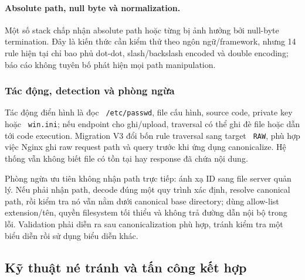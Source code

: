 \documentclass[runningheads]{report-template/llncs}
\newcommand{\code}[1]{\texttt{\small\hyphenchar\font=45 #1}}
\begin{document}
\paragraph{Absolute path, null byte và normalization.}
Một số stack chấp nhận absolute path hoặc từng bị ảnh hưởng bởi null-byte
termination. Đây là kiến thức cần kiểm thử theo ngôn ngữ/framework, nhưng
14 rule hiện tại chỉ bao phủ dot-dot, slash/backslash encoded và double
encoding; báo cáo không tuyên bố phát hiện mọi path manipulation.

\subsubsection{Tác động, detection và phòng ngừa}

Tác động điển hình là đọc \code{/etc/passwd}, file cấu hình, source code,
private key hoặc \code{win.ini}; nếu endpoint cho ghi/upload, traversal
có thể ghi đè file hoặc dẫn tới code execution. Migration V3 đổi bốn rule
traversal sang target \code{RAW}, phù hợp việc Nginx ghi raw request path
và query trước khi ứng dụng canonicalize. Hệ thống vẫn không biết file
có tồn tại hay response đã chứa nội dung.

Phòng ngừa ưu tiên không nhận path trực tiếp: ánh xạ ID sang file server
quản lý. Nếu phải nhận path, decode đúng một quy trình xác định, resolve
canonical path, rồi kiểm tra nó vẫn nằm dưới canonical base directory;
dùng allow-list extension/tên, quyền filesystem tối thiểu và không trả
đường dẫn nội bộ trong lỗi. Validation phải diễn ra sau canonicalization
phù hợp, tránh kiểm tra một biểu diễn rồi sử dụng biểu diễn khác.

\subsection{Kỹ thuật né tránh và tấn công kết hợp}
\end{document}
